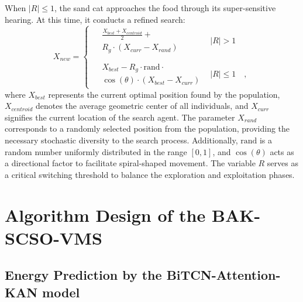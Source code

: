 \documentclass[conference]{{IEEEtran}}
\begin{document}
When $|R| \le 1$, the sand cat approaches the food through its super-sensitive hearing. At this time, it conducts a refined search:
\begin{equation}
    X_{new} = 
    \begin{cases} 
    \begin{aligned}
        &\frac{X_{best} + X_{centroid}}{2} + \\
        &R_g \cdot (X_{curr} - X_{rand}) 
    \end{aligned} 
    & |R| > 1 \quad \\
    \\[5pt]   
    \begin{aligned}
        &X_{best} - R_g \cdot \text{rand} \cdot \\
        &\cos(\theta) \cdot (X_{best} - X_{curr})
    \end{aligned} 
    & |R| \le 1 \quad,
    \end{cases}
    \label{eq:scso_update}
\end{equation}where  $X_{best}$ represents the current optimal position found by the population, $X_{centroid}$ denotes the average geometric center of all individuals, and $X_{curr}$ signifies the current location of the search agent. The parameter $X_{rand}$ corresponds to a randomly selected position from the population, providing the necessary stochastic diversity to the search process. Additionally, $\text{rand}$ is a random number uniformly distributed in the range $[0, 1]$, and $\cos(\theta)$ acts as a directional factor to facilitate spiral-shaped movement. The variable $R$ serves as a critical switching threshold to balance the exploration and exploitation phases. 

\section{Algorithm Design of the BAK-SCSO-VMS}

\subsection{Energy Prediction by the BiTCN-Attention-KAN model}
\end{document}
